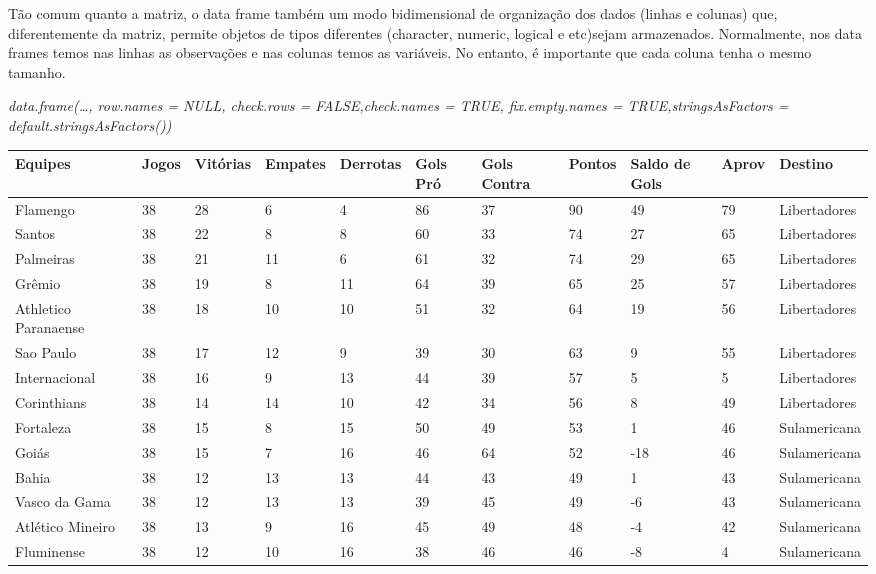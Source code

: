 \documentclass[
]{book}
\begin{document}
Tão comum quanto a matriz, o data frame também um modo bidimensional de organização dos dados (linhas e colunas) que, diferentemente da matriz, permite objetos de tipos diferentes (character, numeric, logical e etc)sejam armazenados.
Normalmente, nos data frames temos nas linhas as observações e nas colunas temos as variáveis.
No entanto, é importante que cada coluna tenha o mesmo tamanho.

\emph{\emph{data.frame(\ldots, row.names = NULL, check.rows = FALSE,check.names = TRUE, fix.empty.names = TRUE,stringsAsFactors = default.stringsAsFactors())}}

\begin{table}
\centering\begingroup\fontsize{11.5}{13.5}\selectfont

\begin{tabular}{l|l|l|l|l|l|l|l|l|l|l}
\hline
Equipes & Jogos & Vitórias & Empates & Derrotas & Gols Pró & Gols Contra & Pontos & Saldo de Gols & Aprov  & Destino\\
\hline
Flamengo & 38 & 28 & 6 & 4 & 86 & 37 & 90 & 49 & 79 & Libertadores\\
\hline
Santos & 38 & 22 & 8 & 8 & 60 & 33 & 74 & 27 & 65 & Libertadores\\
\hline
Palmeiras & 38 & 21 & 11 & 6 & 61 & 32 & 74 & 29 & 65 & Libertadores\\
\hline
Grêmio & 38 & 19 & 8 & 11 & 64 & 39 & 65 & 25 & 57 & Libertadores\\
\hline
Athletico Paranaense & 38 & 18 & 10 & 10 & 51 & 32 & 64 & 19 & 56 & Libertadores\\
\hline
Sao Paulo & 38 & 17 & 12 & 9 & 39 & 30 & 63 & 9 & 55 & Libertadores\\
\hline
Internacional & 38 & 16 & 9 & 13 & 44 & 39 & 57 & 5 & 5 & Libertadores\\
\hline
Corinthians & 38 & 14 & 14 & 10 & 42 & 34 & 56 & 8 & 49 & Libertadores\\
\hline
Fortaleza & 38 & 15 & 8 & 15 & 50 & 49 & 53 & 1 & 46 & Sulamericana\\
\hline
Goiás & 38 & 15 & 7 & 16 & 46 & 64 & 52 & -18 & 46 & Sulamericana\\
\hline
Bahia & 38 & 12 & 13 & 13 & 44 & 43 & 49 & 1 & 43 & Sulamericana\\
\hline
Vasco da Gama & 38 & 12 & 13 & 13 & 39 & 45 & 49 & -6 & 43 & Sulamericana\\
\hline
Atlético Mineiro & 38 & 13 & 9 & 16 & 45 & 49 & 48 & -4 & 42 & Sulamericana\\
\hline
Fluminense & 38 & 12 & 10 & 16 & 38 & 46 & 46 & -8 & 4 & Sulamericana\\

\end{tabular}
\end{table}
\end{document}
